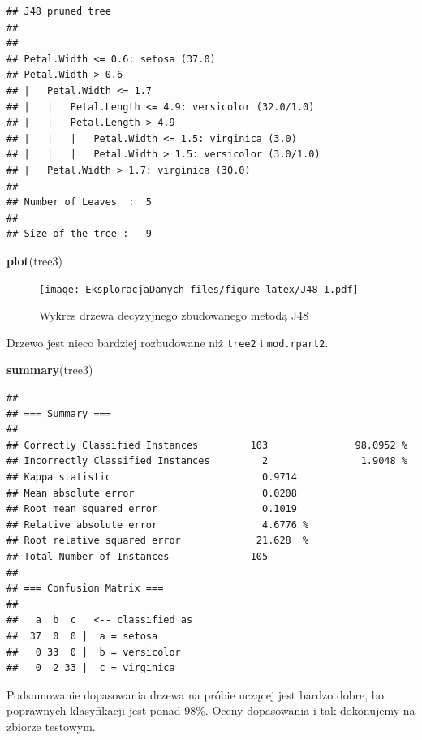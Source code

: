 \documentclass[]{book}
\newenvironment{Shaded}{\begin{snugshade}}{\end{snugshade}}
\newcommand{\KeywordTok}[1]{\textcolor[rgb]{0.13,0.29,0.53}{\textbf{#1}}}
\newcommand{\NormalTok}[1]{#1}
\theoremstyle{plain}
\theoremstyle{definition}
\theoremstyle{definition}
\theoremstyle{definition}
\theoremstyle{definition}
\theoremstyle{remark}
\begin{document}
\begin{verbatim}
## J48 pruned tree
## ------------------
## 
## Petal.Width <= 0.6: setosa (37.0)
## Petal.Width > 0.6
## |   Petal.Width <= 1.7
## |   |   Petal.Length <= 4.9: versicolor (32.0/1.0)
## |   |   Petal.Length > 4.9
## |   |   |   Petal.Width <= 1.5: virginica (3.0)
## |   |   |   Petal.Width > 1.5: versicolor (3.0/1.0)
## |   Petal.Width > 1.7: virginica (30.0)
## 
## Number of Leaves  :  5
## 
## Size of the tree :   9
\end{verbatim}

\begin{Shaded}
\begin{Highlighting}[]
\KeywordTok{plot}\NormalTok{(tree3)}
\end{Highlighting}
\end{Shaded}

\begin{figure}
\centering
\texttt{[image: EksploracjaDanych\_files/figure-latex/J48-1.pdf]}
\caption{\label{fig:J48}Wykres drzewa decyzyjnego zbudowanego metodą J48}
\end{figure}

Drzewo jest nieco bardziej rozbudowane niż \texttt{tree2} i \texttt{mod.rpart2}.

\begin{Shaded}
\begin{Highlighting}[]
\KeywordTok{summary}\NormalTok{(tree3)}
\end{Highlighting}
\end{Shaded}

\begin{verbatim}
## 
## === Summary ===
## 
## Correctly Classified Instances         103               98.0952 %
## Incorrectly Classified Instances         2                1.9048 %
## Kappa statistic                          0.9714
## Mean absolute error                      0.0208
## Root mean squared error                  0.1019
## Relative absolute error                  4.6776 %
## Root relative squared error             21.628  %
## Total Number of Instances              105     
## 
## === Confusion Matrix ===
## 
##   a  b  c   <-- classified as
##  37  0  0 |  a = setosa
##   0 33  0 |  b = versicolor
##   0  2 33 |  c = virginica
\end{verbatim}

Podsumowanie dopasowania drzewa na próbie uczącej jest bardzo dobre, bo poprawnych klasyfikacji jest ponad 98\%. Oceny dopasowania i tak dokonujemy na zbiorze testowym.
\end{document}
